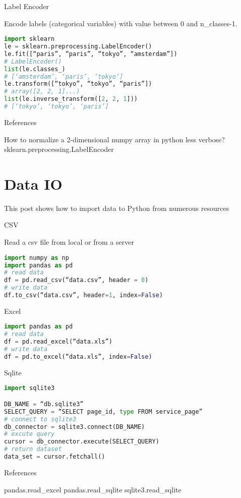Label Encoder

Encode labels (categorical variables) with value between 0 and n_classes-1.

\begin{lstlisting}[language=Python]
import sklearn
le = sklearn.preprocessing.LabelEncoder()
le.fit([“paris”, “paris”, “tokyo”, “amsterdam”])
# LabelEncoder()
list(le.classes_)
# [‘amsterdam’, ‘paris’, ‘tokyo’]
le.transform([“tokyo”, “tokyo”, “paris”])
# array([2, 2, 1]...)
list(le.inverse_transform([2, 2, 1]))
# [‘tokyo’, ‘tokyo’, ‘paris’]
\end{lstlisting}

References

How to normalize a 2-dimensional numpy array in python less verbose?
sklearn.preprocessing.LabelEncoder

\section{Data IO}

This post shows how to import data to Python from numerous resources

CSV

Read a csv file from local or from a server

\begin{lstlisting}[language=Python]
import numpy as np
import pandas as pd
# read data
df = pd.read_csv(“data.csv”, header = 0)
# write data
df.to_csv(“data.csv”, header=1, index=False)
\end{lstlisting}

Excel

\begin{lstlisting}[language=Python]
import pandas as pd
# read data
df = pd.read_excel(“data.xls”)
# write data
df = pd.to_excel(“data.xls”, index=False)
\end{lstlisting}

Sqlite

\begin{lstlisting}[language=Python]
import sqlite3

DB_NAME = “db.sqlite3”
SELECT_QUERY = “SELECT page_id, type FROM service_page”
# connect to sqlite3
db_connector = sqlite3.connect(DB_NAME)
# excute query
cursor = db_connector.execute(SELECT_QUERY)
# return dataset
data_set = cursor.fetchall()
\end{lstlisting}

References

pandas.read_excel
pandas.read_sqlite
sqlite3.read_sqlite

